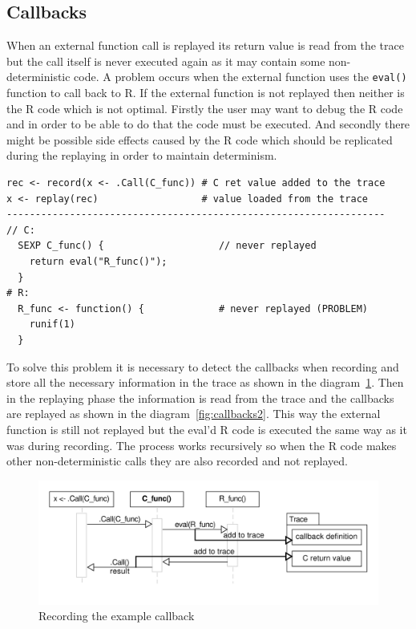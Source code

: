\documentclass[thesis=M,english,hidelinks]{FITthesis}[2012/10/20]
\begin{document}
		\subsection{Callbacks}
		When an external function call is replayed its return value is read from the trace but the call itself is never executed again as it may contain some non-deterministic code. A problem occurs when the external function uses the \lstinline|eval()| function to call back to R. If the external function is not replayed then neither is the R code which is not optimal. Firstly the user may want to debug the R code and in order to be able to do that the code must be executed. And secondly there might be possible side effects caused by the R code which should be replicated during the replaying in order to maintain determinism.\par
		
\begin{lstlisting}[style=filestyle, caption={Simple example of the callback problem}]
rec <- record(x <- .Call(C_func)) # C ret value added to the trace
x <- replay(rec)                  # value loaded from the trace
------------------------------------------------------------------
// C:
  SEXP C_func() {                    // never replayed
    return eval("R_func()");
  }
# R:
  R_func <- function() {             # never replayed (PROBLEM)
    runif(1)
  }
\end{lstlisting}

		To solve this problem it is necessary to detect the callbacks when recording and store all the necessary information in the trace as shown in the diagram~\ref{fig:callbacks}. Then in the replaying phase the information is read from the trace and the callbacks are replayed as shown in the diagram~\ref{fig:callbacks2}. This way the external function is still not replayed but the eval'd R code is executed the same way as it was during recording. The process works recursively so when the R code makes other non-deterministic calls they are also recorded and not replayed. \par
		
		\vspace{-10pt}
		\begin{figure}[ht]\centering
			\setlength{\abovecaptionskip}{-15pt}
			\includegraphics[width=1.0\textwidth]{img/callbacks}
			\caption{Recording the example callback}\label{fig:callbacks}
		\end{figure}
		
\end{document}
